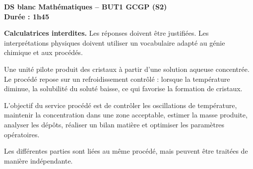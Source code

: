 \documentclass[10pt,a4paper]{article}
\begin{document}
	
	\thispagestyle{plain}
	\pagestyle{fancy}
	
	\begin{titlebox}
		\begin{center}
			{\Large\bfseries\textcolor{DeepBlue}{DS blanc Mathématiques -- BUT1 GCGP (S2)}}\\[-0.1mm]
			{\normalsize\bfseries Durée : 1h45}
		\end{center}
		
		\vspace{-3mm}
		
		\begin{alertbox}
			\centering
			\textbf{Calculatrices interdites.} Les réponses doivent être justifiées. Les interprétations physiques doivent utiliser un vocabulaire adapté au génie chimique et aux procédés.
		\end{alertbox}
	\end{titlebox}
	
	\vspace{-1mm}
	
	\begin{contextbox}
		Une unité pilote produit des cristaux à partir d'une solution aqueuse concentrée. Le procédé repose sur un refroidissement contrôlé : lorsque la température diminue, la solubilité du soluté baisse, ce qui favorise la formation de cristaux.
		
		L'objectif du service procédé est de contrôler les oscillations de température, maintenir la concentration dans une zone acceptable, estimer la masse produite, analyser les dépôts, réaliser un bilan matière et optimiser les paramètres opératoires.
		
		Les différentes parties sont liées au même procédé, mais peuvent être traitées de manière indépendante.
	\end{contextbox}
	
\end{document}

